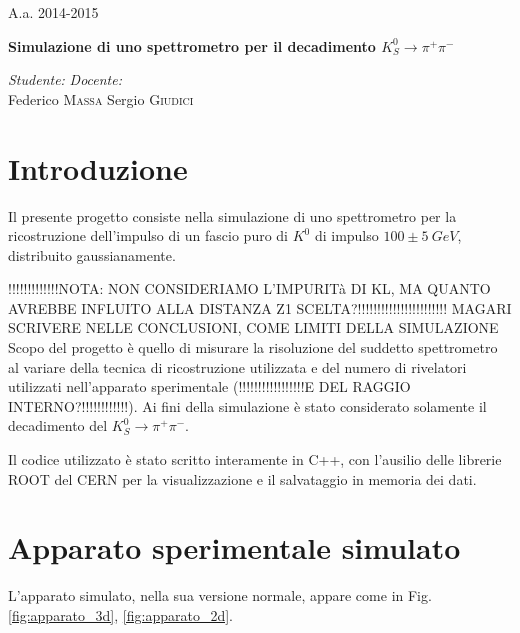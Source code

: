 \documentclass[8pt]{extarticle}
\begin{document}
\label{tab:apparato}\Large{A.a. 2014-2015}
\vspace{10cm}
\begin{center}
\Huge\textbf{Simulazione di uno spettrometro per il decadimento $K^0_S \rightarrow \pi^+ \pi^-$}
\end{center}

\vspace{2cm}
\begin{flushleft}
\medskip
\textit{Studente:} 
\hspace{10 cm}
\textit{Docente:} \\
\medskip
Federico \textsc{Massa}
\hspace{9 cm}
Sergio \textsc{Giudici}
\end{flushleft}



\newpage

\begin{abstract}	
\justify
 
\end{abstract}
\bigskip

\section{Introduzione} \label{sec:intro}
\justify
Il presente progetto consiste nella simulazione di uno spettrometro per la ricostruzione dell'impulso di un fascio puro di $K^0$ di impulso $100 \pm 5 \ GeV$, distribuito gaussianamente.
\medskip

!!!!!!!!!!!!!NOTA: NON CONSIDERIAMO L'IMPURITà DI KL, MA QUANTO AVREBBE INFLUITO ALLA DISTANZA Z1 SCELTA?!!!!!!!!!!!!!!!!!!!!!!! MAGARI SCRIVERE NELLE CONCLUSIONI, COME LIMITI DELLA SIMULAZIONE\\

Scopo del progetto è quello di misurare la risoluzione del suddetto spettrometro al variare della tecnica di ricostruzione utilizzata e del numero di rivelatori utilizzati nell'apparato sperimentale (!!!!!!!!!!!!!!!!!E DEL RAGGIO INTERNO?!!!!!!!!!!!!). Ai fini della simulazione è stato considerato solamente il decadimento del $K^0_S \rightarrow \pi^+ \pi^-$. 

Il codice utilizzato è stato scritto interamente in C++, con l'ausilio delle librerie ROOT del CERN per la visualizzazione e il salvataggio in memoria dei dati. \\

\section{Apparato sperimentale simulato} \label{sec:apparato}
L'apparato simulato, nella sua versione normale, appare come in Fig. \ref{fig:apparato_3d}, \ref{fig:apparato_2d}.
\end{document}
